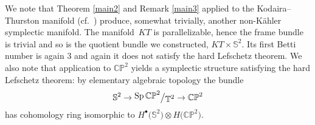 \documentclass[pdftex]{sigma}
\numberwithin{equation}{section}
\newcommand{\bigslant}[2]{{\raisebox{.2em}{$#1$}\big/\raisebox{-.2em}{$#2$}}}
\begin{document}
We note that Theorem \ref{main2} and Remark \ref{main3} applied to the Kodaira--Thurston manifold (cf.~\cite{thurston}) produce, somewhat trivially, another non-K\"ahler symplectic manifold. The mani\-fold~$KT$ is parallelizable, hence the frame bundle is trivial and so is the quotient bundle we constructed, $KT\times\mathbb{S}^2$. Its first Betti number is again 3 and again it does not satisfy the hard Lefschetz theorem. We also note that application to $\mathbb{CP}^2$ yields a symplectic structure satisfying the hard Lefschetz theorem: by elementary algebraic topology the bundle
\begin{gather*}
\mathbb{S}^2 \to \bigslant{\operatorname{Sp}\mathbb{CP}^2}{\mathbb{T}^2} \to \mathbb{CP}^2
\end{gather*}
has cohomology ring isomorphic to $H^{\bullet}\big(\mathbb{S}^2\big)\otimes H\big(\mathbb{CP}^2\big)$.
\end{document}
